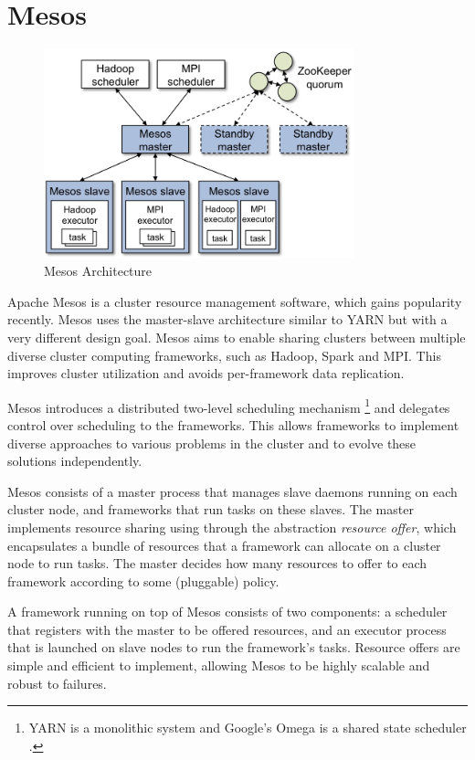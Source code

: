 \documentclass[12pt]{book}
\begin{document}
\section[Mesos]
{Mesos}
\begin{figure}[t]
\includegraphics[width=0.8\textwidth]{images/mesos-architecture.jpg}
\centering
\caption{Mesos Architecture}
\end{figure}

Apache Mesos \cite{Hindman:2011:MPF} is a cluster resource management software, which gains popularity recently. Mesos uses the master-slave architecture similar to YARN but with a very different design goal. Mesos aims to enable sharing clusters between multiple diverse cluster computing frameworks, such as Hadoop, Spark and MPI. This improves cluster utilization and avoids per-framework data replication.

Mesos introduces a distributed two-level scheduling mechanism \footnote{YARN is a monolithic system and Google's Omega is a shared state scheduler \cite{Schwarzkopf:2013:OFS}.} and delegates control over scheduling to the frameworks. This allows frameworks to implement diverse approaches to various problems in the cluster and to evolve these solutions independently.

Mesos consists of a master process that manages slave daemons running on each cluster node, and frameworks that run tasks on these slaves.
The master implements resource sharing using through the abstraction {\em resource offer}, which encapsulates a bundle of resources that a framework can allocate on a cluster node to run tasks. The master decides how many resources to offer to each framework according to some (pluggable) policy.

A framework running on top of Mesos consists of two components: a scheduler that registers with the master to be offered resources, and an executor process that is launched on slave nodes to run the framework's tasks.
Resource offers are simple and efficient to implement, allowing Mesos to be highly scalable and robust to failures.
\end{document}
